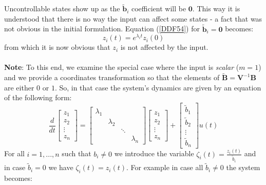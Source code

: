 \documentclass[a4paper,10pt,oneside]{book}
\begin{document}
Uncontrollable states show up as the $\tilde{\mathbf{b}}_i$ coefficient will be $\mathbf{0}$. This way it is understood that there is no way the input can affect some states - a fact that was not obvious in the initial formulation. Equation (\ref{DDF54}) for $\tilde{\mathbf{b}}_i=\mathbf{0}$ becomes:
\begin{equation}
 z_i(t) = e^{\lambda_i t}z_i(0)
\end{equation}
from which it is now obvious that $z_i$ is not affected by the input.\\
\\
\textbf{Note}: To this end, we examine the special case where the input is \emph{scalar} ($m=1$) and we provide a coordinates transformation so that the elements of $\tilde{\mathbf{B}}=\mathbf{V}^{-1}\mathbf{B}$ are either $0$ or $1$. So, in that case the system's dynamics are given by an equation of the following form:
\begin{equation}
 \frac{d}{dt}\left[ {\begin{array}{c}
 z_1 \\
 z_2 \\
 \vdots  \\
 z_n
 \end{array} } \right] = 
\left[ {\begin{array}{cccc}
 \lambda_1 & & & \\
 & \lambda_2 & & \\
 & & \ddots & \\
 & & & \lambda_n
 \end{array} } \right]
\left[ {\begin{array}{c}
 z_1 \\
 z_2 \\
 \vdots  \\
 z_n
 \end{array} } \right]+
\left[ {\begin{array}{c}
 \tilde{b}_1 \\
 \tilde{b}_2 \\
 \vdots  \\
 \tilde{b}_n
 \end{array} } \right]
 u(t)
\end{equation} 
For all $i=1,...,n$ such that $b_i\neq 0$ we introduce the variable $\zeta_i(t)=\frac{z_i(t)}{\tilde{b}_i}$ and in case $\tilde{b}_i=0$ we have $\zeta_i(t)=z_i(t)$. For example in case all $\tilde{b}_i \neq 0$ the system becomes:
\end{document}
